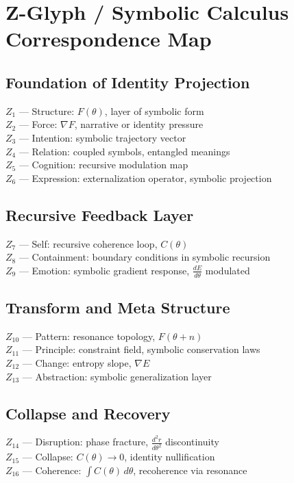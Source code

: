 \documentclass[12pt]{article}
\begin{document}
\section{Z-Glyph / Symbolic Calculus Correspondence Map}

\subsection*{Foundation of Identity Projection}
$Z_1$ — Structure: $F(\theta)$, layer of symbolic form\\
$Z_2$ — Force: $\nabla F$, narrative or identity pressure\\
$Z_3$ — Intention: symbolic trajectory vector\\
$Z_4$ — Relation: coupled symbols, entangled meanings\\
$Z_5$ — Cognition: recursive modulation map\\
$Z_6$ — Expression: externalization operator, symbolic projection

\subsection*{Recursive Feedback Layer}
$Z_7$ — Self: recursive coherence loop, $C(\theta)$\\
$Z_8$ — Containment: boundary conditions in symbolic recursion\\
$Z_9$ — Emotion: symbolic gradient response, $\frac{dE}{d\theta}$ modulated

\subsection*{Transform and Meta Structure}
$Z_{10}$ — Pattern: resonance topology, $F(\theta + n)$\\
$Z_{11}$ — Principle: constraint field, symbolic conservation laws\\
$Z_{12}$ — Change: entropy slope, $\nabla E$\\
$Z_{13}$ — Abstraction: symbolic generalization layer

\subsection*{Collapse and Recovery}
$Z_{14}$ — Disruption: phase fracture, $\frac{d^2r}{d\theta^2}$ discontinuity\\
$Z_{15}$ — Collapse: $C(\theta) \to 0$, identity nullification\\
$Z_{16}$ — Coherence: $\int C(\theta) \, d\theta$, recoherence via resonance
\end{document}
